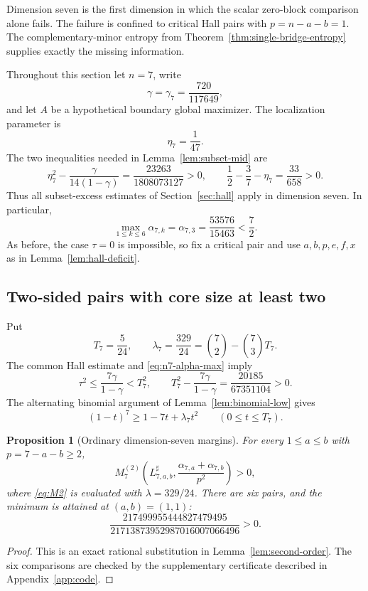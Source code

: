 \documentclass[11pt]{article}
\newtheorem{proposition}[theorem]{Proposition}
\theoremstyle{definition}
\newcommand{\1}{\mathbf{1}}
\begin{document}
Dimension seven is the first dimension in which the scalar zero-block
comparison alone fails.  The failure is confined to critical Hall pairs with
$p=n-a-b=1$.  The complementary-minor entropy from
Theorem~\ref{thm:single-bridge-entropy} supplies exactly the missing
information.

Throughout this section let $n=7$, write
\[
 \gamma=\gamma_7=\frac{720}{117649},
\]
and let $A$ be a hypothetical boundary global maximizer.  The localization
parameter is
\[
 \eta_7=\frac1{47}.
\]
The two inequalities needed in Lemma~\ref{lem:subset-mid} are
\[
 \eta_7^2-\frac{\gamma}{14(1-\gamma)}
 =\frac{23263}{1808073127}>0,
 \qquad
 \frac12-\frac37-\eta_7=\frac{33}{658}>0.
 \tag{8.1}\label{eq:n7-localization}
\]
Thus all subset-excess estimates of Section~\ref{sec:hall} apply in dimension
seven.  In particular,
\[
 \max_{1\le k\le6}\alpha_{7,k}
 =\alpha_{7,3}=\frac{53576}{15463}<\frac72.
 \tag{8.2}\label{eq:n7-alpha-max}
\]
As before, the case $\tau=0$ is impossible, so fix a critical pair and use
$a,b,p,e,f,x$ as in Lemma~\ref{lem:hall-deficit}.

\subsection{Two-sided pairs with core size at least two}

Put
\[
 T_7=\frac5{24},
 \qquad
 \lambda_7=\frac{329}{24}
 =\binom72-\binom73T_7.
 \tag{8.3}\label{eq:n7-ordinary-parameters}
\]
The common Hall estimate and \eqref{eq:n7-alpha-max} imply
\[
 \tau^2\le\frac{7\gamma}{1-\gamma}<T_7^2,
 \qquad
 T_7^2-\frac{7\gamma}{1-\gamma}
 =\frac{20185}{67351104}>0.
 \tag{8.4}\label{eq:n7-ordinary-range}
\]
The alternating binomial argument of Lemma~\ref{lem:binomial-low} gives
\[
 (1-t)^7\ge1-7t+\lambda_7t^2
 \qquad(0\le t\le T_7).
 \tag{8.5}\label{eq:n7-ordinary-binomial}
\]

\begin{proposition}[Ordinary dimension-seven margins]\label{prop:n7-ordinary}
For every $1\le a\le b$ with $p=7-a-b\ge2$,
\[
 M_7^{(2)}\left(L^{\sharp}_{7,a,b},
 \frac{\alpha_{7,a}+\alpha_{7,b}}{p^2}\right)>0,
\]
where \eqref{eq:M2} is evaluated with $\lambda=329/24$.
There are six pairs, and the minimum is attained at $(a,b)=(1,1)$:
\[
 \frac{217499955444827479495}
 {21713873952987016007066496}>0.
 \tag{8.6}\label{eq:n7-ordinary-minimum}
\]
\end{proposition}

\begin{proof}
This is an exact rational substitution in Lemma~\ref{lem:second-order}.
The six comparisons are checked by the supplementary certificate described in
Appendix~\ref{app:code}.
\end{proof}
\end{document}
